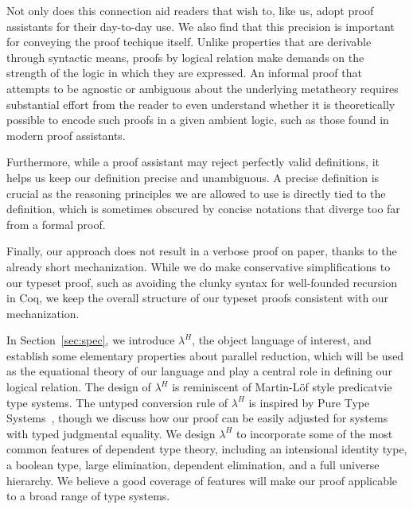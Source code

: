 \documentclass[acmsmall,screen=true,
\ifpublic review=false\else,review=true\fi
  ,anonymous=\ifanonymous true\else false\fi]{acmart}
\newcommand{\lang}{$\lambda^H$\xspace}
\begin{document}
Not only does this connection aid readers that wish to, like us, adopt proof
assistants for their day-to-day use. We also find that this precision is
important for conveying the proof techique itself. Unlike properties that are
derivable through syntactic means, proofs by logical relation make demands on
the strength of the logic in which they are expressed. An informal proof that
attempts to be agnostic or ambiguous about the underlying
metatheory %
requires substantial
effort from the reader to even understand whether it is theoretically
possible to encode such proofs in a given ambient logic, such as those found
in modern proof assistants.

Furthermore, while a proof assistant may reject perfectly valid definitions,
it helps us keep our definition precise and unambiguous. A precise definition
is crucial as the reasoning principles we are allowed to use is directly tied
to the definition, which is sometimes obscured by concise notations that
diverge too far from a formal proof.

Finally, our approach does not result in a verbose proof on paper, thanks to
the already short mechanization. While we do make conservative simplifications
to our typeset proof, such as avoiding the clunky syntax for well-founded
recursion in Coq, we keep the overall structure of our typeset proofs
consistent with our mechanization.

In Section~\ref{sec:spec}, we introduce \lang{}, the object language
of interest, and establish some elementary properties about parallel
reduction, which will be used as the equational theory of our language
and play a central role in defining our logical relation. The design
of \lang{} is reminiscent of Martin-Löf style predicatvie type
systems. The untyped conversion rule of \lang{} is inspired by Pure
Type Systems~\citet{barendregt1991introduction}, though we discuss how
our proof can be easily adjusted for systems with typed judgmental
equality.  We design \lang{} to incorporate some of the most common
features of dependent type theory, including an intensional identity
type, a boolean type, large elimination, dependent elimination, and a
full universe hierarchy. We believe a good coverage of features will
make our proof applicable to a broad range of type systems.
\end{document}
